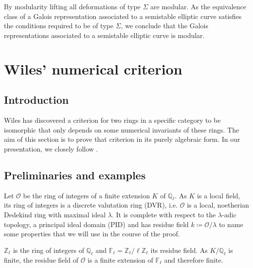 \documentclass{article}
\theoremstyle{plain}%
\theoremstyle{definition}
\theoremstyle{remark}
\begin{document}
By modularity lifting all deformations of type \(\Sigma\) are modular. As the equivalence class of a 
Galois representation associated to a semistable elliptic curve satisfies the conditions required to be of type \(\Sigma\),
we conclude that the Galois representations associated to a semistable elliptic curve is modular.

\newpage

\section{Wiles' numerical criterion}
\subsection{Introduction}
Wiles has discovered a criterion for two rings in a specific category to be isomorphic 
that only depends on some numerical invariants of these rings. 
The aim of this section is to prove that criterion in its purely algebraic form. 
In our presentation, we closely follow \cite[5.1 - 5.8]{Darmon1995}.

\subsection{Preliminaries and examples}
Let \(\mathcal{O}\) be the ring of integers of a finite extension \(K\) of \(\mathbb Q_\ell\). 
As \(K\) is a local field, its ring of integers is a discrete valutation ring (DVR), i.e. 
\(\mathcal O\) is a local, noetherian Dedekind ring with maximal ideal \(\lambda\). 
It is complete with respect to the \(\lambda\)-adic topology, a principal ideal domain (PID) 
and has residue field \(k \coloneqq \mathcal{O}/\lambda\) 
to name some properties that we will use in the course of the proof.

\(\mathbb Z_\ell\) is the ring of integers of \(\mathbb Q_\ell\) and 
\(\mathbb F_\ell = \mathbb Z_\ell/\ell \mathbb Z_\ell\) its residue field. 
As \(K/\mathbb{Q}_\ell\) is finite, the residue field of \(\mathcal{O}\) 
is a finite extension of $\mathbb F_\ell$ and therefore finite. 
\end{document}
